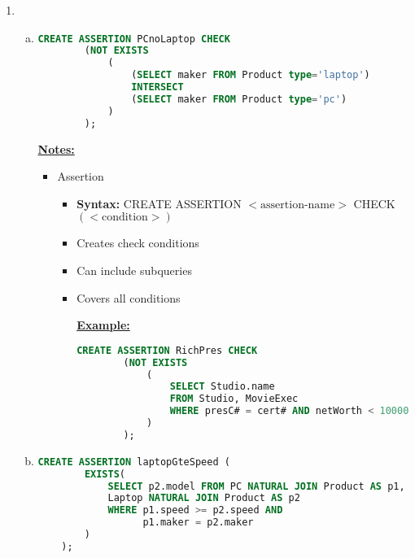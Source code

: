 \documentclass[12pt]{article}
\begin{document}
\begin{enumerate}[1.]
\begin{enumerate}[a)]
    \end{enumerate}

    \item

    \begin{enumerate}[a)]
        \item

    \begin{lstlisting}[language=SQL]
    CREATE ASSERTION PCnoLaptop CHECK
        (NOT EXISTS
            (
                (SELECT maker FROM Product type='laptop')
                INTERSECT
                (SELECT maker FROM Product type='pc')
            )
        );
    \end{lstlisting}

        \bigskip

        \underline{\textbf{Notes:}}

        \bigskip

        \begin{itemize}
            \item Assertion
            \begin{itemize}
                \item \textbf{Syntax:} CREATE ASSERTION $<\text{assertion-name}>$ CHECK $(<\text{condition}>)$
                \item Creates check conditions
                \item Can include subqueries
                \item Covers all conditions

                \bigskip

                \underline{\textbf{Example:}}

                \bigskip

    \begin{lstlisting}[language=SQL]
    CREATE ASSERTION RichPres CHECK
        (NOT EXISTS
            (
                SELECT Studio.name
                FROM Studio, MovieExec
                WHERE presC# = cert# AND netWorth < 10000000
            )
        );
    \end{lstlisting}
            \end{itemize}
        \end{itemize}

        \item

    \begin{lstlisting}[language=SQL]
    CREATE ASSERTION laptopGteSpeed (
        EXISTS(
            SELECT p2.model FROM PC NATURAL JOIN Product AS p1,
            Laptop NATURAL JOIN Product AS p2
            WHERE p1.speed >= p2.speed AND
                  p1.maker = p2.maker
        )
    );
    \end{lstlisting}


\end{enumerate}
\end{enumerate}
\end{document}
